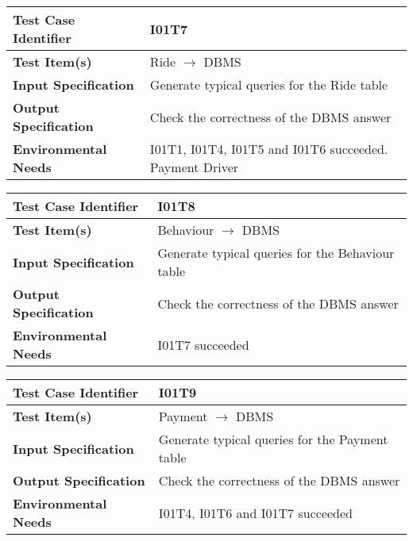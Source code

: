 \begin{center}
	\vspace{0.6cm}
	\begin{tabular}{|l|l|}
		\hline
		\textbf{Test Case Identifier} & I01T7 \bigstrut \\\hline
		\textbf{Test Item(s)} & Ride \ensuremath{\rightarrow} DBMS \bigstrut \\\hline
		\textbf{Input Specification} & Generate typical queries for the Ride table \bigstrut \\\hline
		\textbf{Output Specification} & Check the correctness of the DBMS answer \bigstrut \\\hline
		\textbf{Environmental Needs} & I01T1, I01T4, I01T5 and I01T6 succeeded. Payment Driver\bigstrut \\\hline
	\end{tabular}
\end{center}

\begin{center}
	\vspace{0.6cm}
	\begin{tabular}{|l|l|}
		\hline
		\textbf{Test Case Identifier} & I01T8 \bigstrut \\\hline
		\textbf{Test Item(s)} & Behaviour \ensuremath{\rightarrow} DBMS \bigstrut \\\hline
		\textbf{Input Specification} & Generate typical queries for the Behaviour table \bigstrut \\\hline
		\textbf{Output Specification} & Check the correctness of the DBMS answer \bigstrut \\\hline
		\textbf{Environmental Needs} & I01T7 succeeded \bigstrut \\\hline
	\end{tabular}
\end{center}

\begin{center}
	\vspace{0.6cm}
	\begin{tabular}{|l|l|}
		\hline
		\textbf{Test Case Identifier} & I01T9 \bigstrut \\\hline
		\textbf{Test Item(s)} & Payment \ensuremath{\rightarrow} DBMS \bigstrut \\\hline
		\textbf{Input Specification} & Generate typical queries for the Payment table \bigstrut \\\hline
		\textbf{Output Specification} & Check the correctness of the DBMS answer \bigstrut \\\hline
		\textbf{Environmental Needs} & I01T4, I01T6 and I01T7 succeeded \bigstrut \\\hline
	\end{tabular}
\end{center}


